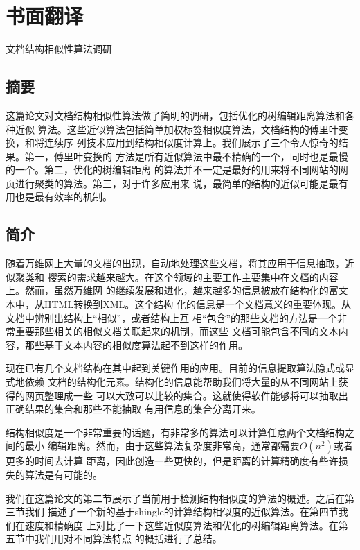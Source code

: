 
\chapter{书面翻译}
\label{chap:translation}
\begin{center}  
  \Large{文档结构相似性算法调研}
\end{center}

\section*{摘要}
  这篇论文对文档结构相似性算法做了简明的调研，包括优化的树编辑距离算法和各种近似
  算法。这些近似算法包括简单加权标签相似度算法，文档结构的傅里叶变换，和将连续序
  列技术应用到结构相似度计算上。我们展示了三个令人惊奇的结果。第一，傅里叶变换的
  方法是所有近似算法中最不精确的一个，同时也是最慢的一个。第二，优化的树编辑距离
  的算法并不一定是最好的用来将不同网站的网页进行聚类的算法。第三，对于许多应用来
  说，最简单的结构的近似可能是最有用也是最有效率的机制。
\section{简介}
随着万维网上大量的文档的出现，自动地处理这些文档，将其应用于信息抽取，近似聚类和
搜索的需求越来越大。在这个领域的主要工作主要集中在文档的内容上。然而，虽然万维网
的继续发展和进化，越来越多的信息被放在结构化的富文本中，从HTML转换到XML。这个结构
化的信息是一个文档意义的重要体现。从文档中辨别出结构上“相似”，或者结构上互
相“包含”的那些文档的方法是一个非常重要那些相关的相似文档关联起来的机制，而这些
文档可能包含不同的文本内容，那些基于文本内容的相似度算法起不到这样的作用。

现在已有几个文档结构在其中起到关键作用的应用。目前的信息提取算法隐式或显式地依赖
文档的结构化元素。结构化的信息能帮助我们将大量的从不同网站上获得的网页整理成一些
可以大致可以比较的集合。这就使得软件能够将可以抽取出正确结果的集合和那些不能抽取
有用信息的集合分离开来。

结构相似度是一个非常重要的话题，有非常多的算法可以计算任意两个文档结构之间的最小
编辑距离。然而，由于这些算法复杂度非常高，通常都需要$O(n^2)$或者更多的时间去计算
距离，因此创造一些更快的，但是距离的计算精确度有些许损失的算法是有可能的。

我们在这篇论文的第二节展示了当前用于检测结构相似度的算法的概述。之后在第三节我们
描述了一个新的基于shingle的计算结构相似度的近似算法。在第四节我们在速度和精确度
上对比了一下这些近似度算法和优化的树编辑距离算法。在第五节中我们用对不同算法特点
的概括进行了总结。

